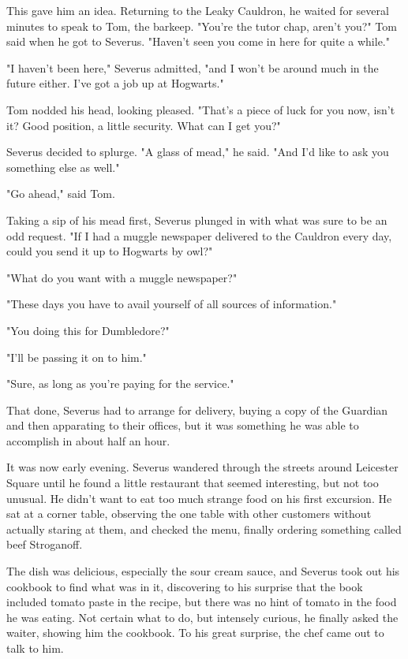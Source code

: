 \documentclass[a4paper,11pt]{article}
\begin{document}
This gave him an idea. Returning to the Leaky Cauldron, he waited for several minutes to speak to Tom, the barkeep. "You're the tutor chap, aren't you?" Tom said when he got to Severus. "Haven't seen you come in here for quite a while."

"I haven't been here," Severus admitted, "and I won't be around much in the future either. I've got a job up at Hogwarts."

Tom nodded his head, looking pleased. "That's a piece of luck for you now, isn't it? Good position, a little security. What can I get you?"

Severus decided to splurge. "A glass of mead," he said. "And I'd like to ask you something else as well."

"Go ahead," said Tom.

Taking a sip of his mead first, Severus plunged in with what was sure to be an odd request. "If I had a muggle newspaper delivered to the Cauldron every day, could you send it up to Hogwarts by owl?"

"What do you want with a muggle newspaper?"

"These days you have to avail yourself of all sources of information."

"You doing this for Dumbledore?"

"I'll be passing it on to him."

"Sure, as long as you're paying for the service."

That done, Severus had to arrange for delivery, buying a copy of the Guardian and then apparating to their offices, but it was something he was able to accomplish in about half an hour.

It was now early evening. Severus wandered through the streets around Leicester Square until he found a little restaurant that seemed interesting, but not too unusual. He didn't want to eat too much strange food on his first excursion. He sat at a corner table, observing the one table with other customers without actually staring at them, and checked the menu, finally ordering something called beef Stroganoff.

The dish was delicious, especially the sour cream sauce, and Severus took out his cookbook to find what was in it, discovering to his surprise that the book included tomato paste in the recipe, but there was no hint of tomato in the food he was eating. Not certain what to do, but intensely curious, he finally asked the waiter, showing him the cookbook. To his great surprise, the chef came out to talk to him.
\end{document}
